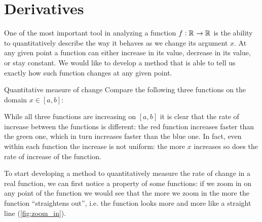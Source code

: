 \section{Derivatives}
One of the most important tool in analyzing a function $f:\mathbb{R}^{}\to\mathbb{R}^{}$ is the ability to quantitatively describe the way it behaves as we change its argument $x$. At any given point a function can either increase in its value, decrease in its value, or stay constant. We would like to develop a method that is able to tell us exactly how such function changes at any given point.

\begin{example}{Quantitative measure of change}{}
  Compare the following three functions on the domain $x\in[a,b]$:

  \centering

  \flushleft
  While all three functions are increasing on $[a,b]$ it is clear that the rate of increase between the functions is different: the red function increases faster than the green one, which in turn increases faster than the blue one. In fact, even within each function the increase is not uniform: the more $x$ increases so does the rate of increase of the function.
\end{example}

To start developing a method to quantitatively measure the rate of change in a real function, we can first notice a property of some functions: if we zoom in on any point of the function we would see that the more we zoom in the more the function ``straightens out'', i.e. the function looks more and more like a straight line (\autoref{fig:zoom_in}).

